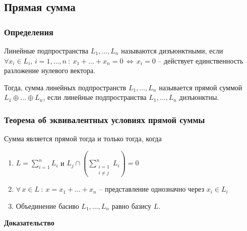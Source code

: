 \documentclass{article}
\begin{document}
\subsection{Прямая сумма}
\subsubsection{Определения}
Линейные подпространства $L_1,\ldots,L_n$ называются дизъюнктными, если $\forall x_i\in L_i, \,i=1,\ldots,n\::\:x_1+\ldots+x_n=0\,\Leftrightarrow\,x_i=0$ -- действует единственность разложение нулевого вектора.

Тогда, сумма линейных подпространств $L_1,\ldots,L_n$ называется прямой суммой $L_1\oplus\ldots\oplus L_n$, если линейные подпространства $L_1,\ldots,L_n$ дизъюнктны.

\subsubsection{Теорема об эквивалентных условиях прямой суммы}
Сумма является прямой тогда и только тогда, когда 
\begin{enumerate}
    \item $L=\sum\limits_{i=1}^n L_i$  и $L_j\cap(\sum\limits_{\substack{i=1\\i\neq j}}^n L_i)=0$
    \item $\forall\,x\in L\::\:x=x_1+\ldots+x_n$ -- представление однозначно через $x_i\in L_i$
    \item Объединение басиво $L_1,\ldots,L_n$ равно базису $L$.
\end{enumerate}
\textbf{Доказательство}
\end{document}
